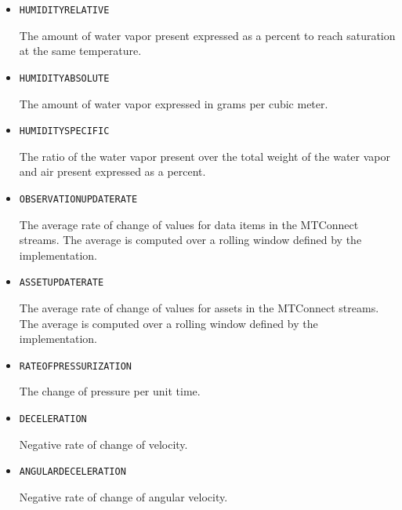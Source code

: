 \begin{itemize}
\item \texttt{HUMIDITY\textunderscore RELATIVE}  

The amount of water vapor present expressed as a percent to reach saturation at the same temperature.


\item \texttt{HUMIDITY\textunderscore ABSOLUTE}  

The amount of water vapor expressed in grams per cubic meter.


\item \texttt{HUMIDITY\textunderscore SPECIFIC}  

The ratio of the water vapor present over the total weight of the water vapor and air present expressed as a percent.


\item \texttt{OBSERVATION\textunderscore UPDATE\textunderscore RATE}  

The average rate of change of values for data items in the MTConnect streams. The average is computed over a rolling window defined by the implementation.


\item \texttt{ASSET\textunderscore UPDATE\textunderscore RATE}  

The average rate of change of values for assets in the MTConnect streams. The average is computed over a rolling window defined by the implementation.


\item \texttt{RATE\textunderscore OF\textunderscore PRESSURIZATION}  

The change of pressure per unit time.


\item \texttt{DECELERATION}  

Negative rate of change of velocity.


\item \texttt{ANGULAR\textunderscore DECELERATION}  

Negative rate of change of angular velocity.

\end{itemize}


